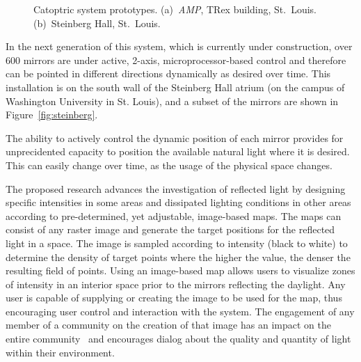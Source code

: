 \begin{figure}[ht]
\centering
{}
\qquad \qquad
{}
\caption{Catoptric system prototypes.
(a)~\emph{AMP}, TRex building, St.~Louis.
(b)~Steinberg Hall, St.~Louis.
}
\label{fig:proto}
\end{figure}

In the next generation of this system, which is currently under construction,
over 600 mirrors are under active, 2-axis, microprocessor-based control and
therefore can be pointed in different directions dynamically as desired
over time. This installation is on the south wall of the Steinberg Hall
atrium (on
the campus of Washington University in St. Louis), and a subset of the
mirrors are shown in Figure~\ref{fig:steinberg}.

The ability to actively control the dynamic position of each mirror provides
for unprecidented capacity to position the available natural light where
it is desired.  This can easily change over time, as the usage of the
physical space changes.

The proposed research advances the investigation of reflected light by
designing specific intensities in some areas and dissipated lighting
conditions in other areas according to pre-determined, yet adjustable,
image-based maps. The maps can consist of any raster image and generate the
target positions for the reflected light in a space.  The image is sampled
according to intensity (black to white) to determine the density
of target points where the higher the value, the denser the resulting
field of points. Using an image-based map allows users to visualize
zones of intensity in an interior space prior to the mirrors reflecting
the daylight. Any user is capable of supplying or creating the image
to be used for the map, thus encouraging user control and interaction with
the system. The engagement of any member of a community on the creation
of that image has an impact on the entire community~\cite{BS13} and
encourages dialog about the quality and quantity of light within their
environment. 

